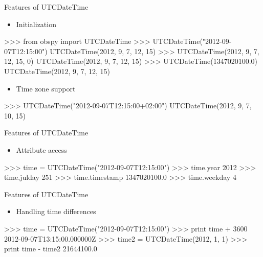 \documentclass[handout]{beamer}
\begin{document}
\begin{frame}{Features of UTCDateTime}
    \begin{itemize}
        \item Initialization
    \end{itemize}
\begin{myColorBox}{0.95}{}
\begin{python}
>>> from obspy import UTCDateTime
>>> UTCDateTime("2012-09-07T12:15:00")
UTCDateTime(2012, 9, 7, 12, 15)
>>> UTCDateTime(2012, 9, 7, 12, 15, 0)
UTCDateTime(2012, 9, 7, 12, 15)
>>> UTCDateTime(1347020100.0)
UTCDateTime(2012, 9, 7, 12, 15)
\end{python}
\end{myColorBox}


\begin{itemize}
    \item Time zone support
\end{itemize}

\begin{myColorBox}{0.95}{}
\begin{python}
>>> UTCDateTime("2012-09-07T12:15:00+02:00")
UTCDateTime(2012, 9, 7, 10, 15)
\end{python}
\end{myColorBox}


\end{frame}


\begin{frame}{Features of UTCDateTime}
    \begin{itemize}
        \item Attribute access
    \end{itemize}
\begin{myColorBox}{0.95}{}
\begin{python}
>>> time = UTCDateTime("2012-09-07T12:15:00")
>>> time.year
2012
>>> time.julday
251
>>> time.timestamp
1347020100.0
>>> time.weekday
4
\end{python}
\end{myColorBox}



\end{frame}



\begin{frame}{Features of UTCDateTime}
    \begin{itemize}
        \item Handling time differences
    \end{itemize}

\begin{myColorBox}{0.95}{}
\begin{python}
>>> time = UTCDateTime("2012-09-07T12:15:00")
>>> print time + 3600
2012-09-07T13:15:00.000000Z
>>> time2 = UTCDateTime(2012, 1, 1)
>>> print time - time2
21644100.0
\end{python}
\end{myColorBox}

\end{frame}
\end{document}
